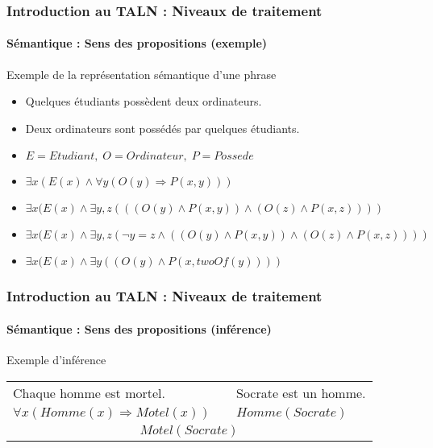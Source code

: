 \documentclass[xcolor=table]{beamer}
\begin{document}
\begin{frame}
\frametitle{Introduction au TALN : Niveaux de traitement}
\framesubtitle{Sémantique : Sens des propositions (exemple)}

\begin{exampleblock}{Exemple de la représentation sémantique d'une phrase}
	\begin{itemize}
		\item Quelques étudiants possèdent deux ordinateurs.
		\item Deux ordinateurs sont possédés par quelques étudiants.
		\item $E = Etudiant, \; O = Ordinateur, \; P = Possede$
		\item $\exists x (E(x) \wedge \forall y ( O(y) \Rightarrow P(x, y)) )$ \textcolor{red}{\XBox}
		\item $\exists x (E(x) \wedge \exists y, z (( (O(y) \wedge P(x, y) ) \wedge (O(z) \wedge P(x, z) ) ))$ \textcolor{red}{\XBox}
		\item $\exists x (E(x) \wedge \exists y, z (\neg y = z \wedge ( (O(y) \wedge P(x, y) ) \wedge (O(z) \wedge P(x, z) ) ))$ \textcolor{green}{\CheckedBox}
		\item $\exists x (E(x) \wedge \exists y ((O(y) \wedge P(x, twoOf(y)) ))$ \textcolor{green}{\CheckedBox}
	\end{itemize}
\end{exampleblock}

\end{frame}

\begin{frame}
\frametitle{Introduction au TALN : Niveaux de traitement}
\framesubtitle{Sémantique : Sens des propositions (inférence)}

\begin{exampleblock}{Exemple d'inférence}
	\centering
	\begin{tabular}{lll}
		Chaque homme est mortel.  & & Socrate est un homme. \\
		$\forall x (Homme(x) \Rightarrow Motel(x))$ && $Homme(Socrate)$ \\
		\hline
		\multicolumn{3}{c}{$Motel(Socrate)$}\\
	\end{tabular}
	
\end{exampleblock}

\end{frame}
\end{document}
